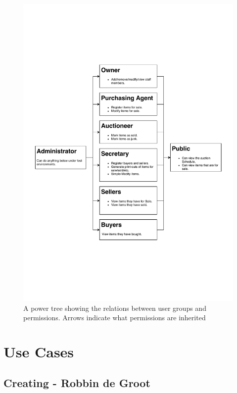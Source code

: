 \documentclass{article}
\begin{document}
\begin{figure}[H]
	\centering
	\includegraphics[scale=.75]{power_tree.pdf}
	\caption*{A power tree showing the relations between user groups and permissions. Arrows indicate what permissions are inherited}
\end{figure}

\section*{Use Cases}
\subsection*{Creating - Robbin de Groot}
\end{document}

